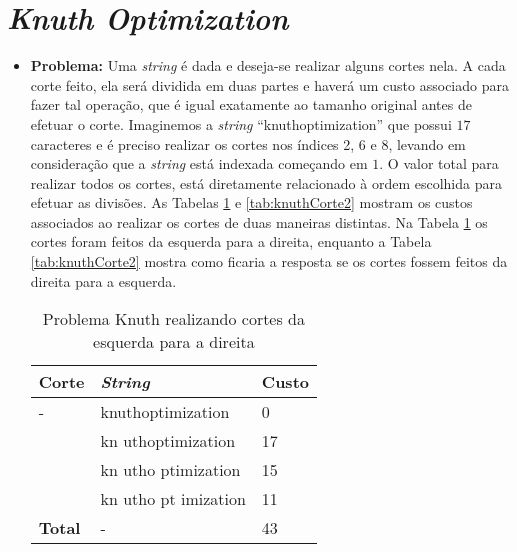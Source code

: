\section{\textit{Knuth Optimization}}
\begin{itemize}[leftmargin=-.001in]
\item \textbf{Problema:}
Uma \textit{string} é dada e deseja-se realizar alguns cortes nela. A cada corte feito, ela será dividida em duas partes e haverá um custo associado para fazer tal operação, que é igual exatamente ao tamanho original antes de efetuar o corte. Imaginemos a \textit{string} \enquote{knuthoptimization} que possui $17$ caracteres e é preciso realizar os cortes nos índices 2, 6 e 8, levando em consideração que a \textit{string} está indexada começando em $1$.
O valor total para realizar todos os cortes, está diretamente relacionado à ordem escolhida para efetuar as divisões. As Tabelas \ref{tab:knuthCorte} e \ref{tab:knuthCorte2} mostram os custos associados ao realizar os cortes de duas maneiras distintas. Na Tabela \ref{tab:knuthCorte} os cortes foram feitos da esquerda para a direita, enquanto a Tabela \ref{tab:knuthCorte2} mostra como ficaria a resposta se os cortes fossem feitos da direita para a esquerda.

\begin{table}[H]
	\centering
	\caption[Problema Knuth realizando cortes da esquerda para a direita]{Problema Knuth realizando cortes da esquerda para a direita}
	\label{tab:knuthCorte}
	\begin{tabular}{p{3cm}p{4cm}p{3cm}}
		\hline \SPACE
		\textbf{Corte} & \textbf{\textit{String}} & \textbf{Custo} \\  \hline \SPACE
		- & knuthoptimization    &  0\\ \hline \SPACE
		2 & kn uthoptimization   &  17\\ \hline \SPACE
		6 & kn utho ptimization  &  15\\ \hline \SPACE
		8 & kn utho pt imization &  11\\ \hline \SPACE
		\textbf{Total}  & -   &  43 \\ \hline  
	\end{tabular} 	
\end{table}


\end{itemize}
